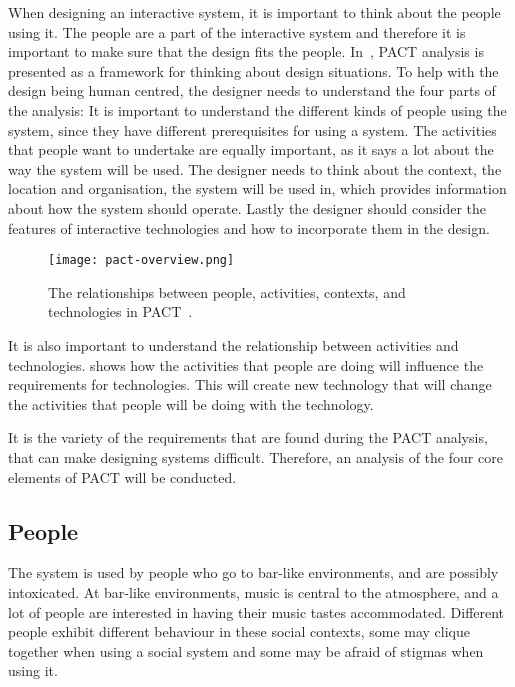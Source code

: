 When designing an interactive system, it is important to think about the people using it. The people are a part of the interactive system and therefore it is important to make sure that the design fits the people. In~, PACT analysis is presented as a framework for thinking about design situations. To help with the design being human centred, the designer needs to understand the four parts of the analysis: It is important to understand the different kinds of people using the system, since they have different prerequisites for using a system. The activities that people want to undertake are equally important, as it says a lot about the way the system will be used. The designer needs to think about the context, the location and organisation, the system will be used in, which provides information about how the system should operate. Lastly the designer should consider the features of interactive technologies and how to incorporate them in the design.

\begin{figure}[hbtp]
  \centering
  \texttt{[image: pact-overview.png]}
  \caption[PACT overview.]{The relationships between people, activities, contexts, and technologies in PACT~\cite{benyon2013designing}.}
  \label{fig:pact-overview}
\end{figure}

It is also important to understand the relationship between activities and technologies.  shows how the activities that people are doing will influence the requirements for technologies. This will create new technology that will change the activities that people will be doing with the technology.

It is the variety of the requirements that are found during the PACT analysis, that can make designing systems difficult. Therefore, an analysis of the four core elements of PACT will be conducted.


\subsection{People}
\label{sub:pact_people}

The system is used by people who go to bar-like environments, and are possibly intoxicated. At bar-like environments, music is central to the atmosphere, and a lot of people are interested in having their music tastes accommodated. Different people exhibit different behaviour in these social contexts, some may clique together when using a social system and some may be afraid of stigmas when using it.

